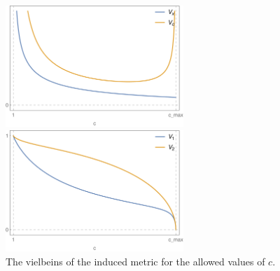 \begin{figure}[t!]
\begin{center}
\includegraphics[width=0.6\textwidth]{pictures/vxvcb.png}
\end{center}
\vspace{0.05mm}
\begin{center}
\includegraphics[width=0.6\textwidth]{pictures/v1v2b.png}
\end{center}
\caption{\label{fig:vielbeins} The vielbeins of the induced metric for the allowed values of $c$.}
\end{figure}
